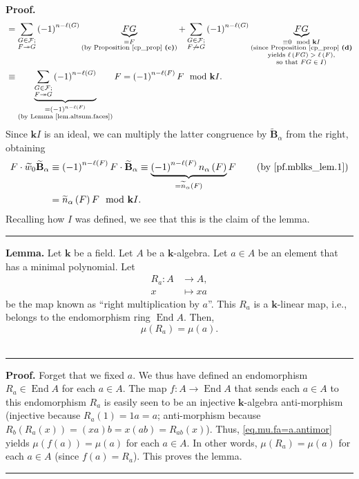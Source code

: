 \documentclass[12pt]{article}
\theoremstyle{definition}%
\newtheorem{lem}[thm]{Lemma}
\theoremstyle{definition}%
\theoremstyle{remark}%
\newcommand{\tup}[1]{\left( #1 \right)}
\newcommand{\kk}{\mathbf{k}}
\newcommand{\BBta}{\widetilde{\mathbf{B}}_{\alpha}}
\newcommand{\CF}{\mathcal{F}}
\newcommand{\wotil}{\widetilde{w}_0}
\newcommand{\na}{n_{ \alpha } }%
\newcommand{\nna}{\widetilde{n}_{ \alpha } }%
\newcommand{\End}{\operatorname{End}}
\newcommand{\con}{\twoheadrightarrow} %
\newenvironment{lem}[1][Lemma]{\noindent\textbf{#1.} }{\ \rule{0.5em}{0.5em}}
\newenvironment{proof}[1][Proof]{\noindent\textbf{#1.} }{\ \rule{0.5em}{0.5em}}
\begin{document}
\begin{proof}
\begin{align*}
           &= \sum_{\substack{G \in \CF; \\ F \con G}} \tup{ -1 }^{n-\ell\tup{ G }} \underbrace{FG}_{\substack{= F \\ \text{(by Proposition \ref{cp_prop} \textbf{(c)})}}}
		   + \sum_{\substack{G \in \CF; \\ F \not\con G}} \tup{ -1 }^{n-\ell\tup{ G }}\underbrace{FG}_{\substack{\equiv 0 \mod \kk I \\ \text{(since Proposition \ref{cp_prop} \textbf{(d)}} \\ \text{yields $\ell\tup{FG} > \ell\tup{F}$,} \\ \text{so that $FG \in I$)}}} \\
           &\equiv \underbrace{\sum_{\substack{G \in \CF; \\ F \con G}} \tup{ -1 }^{n-\ell\tup{ G }}}_{\substack{= \tup{-1}^{n - \ell\tup{F}} \\ \text{(by Lemma \ref{lem.altsum.faces})}}} F
		   = \tup{-1}^{n - \ell\tup{F}} F \mod \kk I.
    \end{align*}
	Since $\kk I$ is an ideal, we can multiply the latter congruence by $\BBta$ from the right, obtaining
    \begin{align*}
           F \cdot \wotil\BBta
           &\equiv \tup{-1}^{n - \ell\tup{F}} F \cdot \BBta
           \equiv \underbrace{\tup{-1}^{n - \ell\tup{F}} \na\tup{F}}_{= \nna\tup{F}} F
		   \qquad \tup{\text{by \eqref{pf.mblks_lem.1}}} \\
		   &= \nna\tup{F} F \mod \kk I.
    \end{align*}
	Recalling how $I$ was defined, we see that this is the claim of the lemma.
\end{proof}

\begin{lem}
\label{lem.muPhi}
Let $\kk$ be a field.
Let $A$ be a $\kk$-algebra. Let $a \in A$ be an element
that has a minimal polynomial.
Let
\begin{align*}
R_a : A &\to A, \\
      x &\mapsto xa
\end{align*}
be the map known as ``right multiplication by $a$''.
This $R_a$ is a $\kk$-linear map, i.e., belongs to
the endomorphism ring $\End A$.
Then,
\[
\mu\tup{R_a} = \mu\tup{a}.
\]
\end{lem}

\begin{proof}
Forget that we fixed $a$.
We thus have defined an endomorphism $R_a \in \End A$
for each $a \in A$.
The map $f : A \to \End A$ that sends each $a \in A$
to this endomorphism $R_a$ is easily seen to be
an injective $\kk$-algebra anti-morphism
(injective because $R_a\tup{1} = 1a = a$;
anti-morphism because $R_b\tup{R_a\tup{x}}
= \tup{xa}b = x\tup{ab} = R_{ab}\tup{x}$).
Thus, \eqref{eq.mu.fa=a.antimor} yields
$\mu\tup{f\tup{a}} = \mu\tup{a}$ for each $a \in A$.
In other words,
$\mu\tup{R_a} = \mu\tup{a}$ for each $a \in A$
(since $f\tup{a} = R_a$).
This proves the lemma.
\end{proof}
\end{document}
